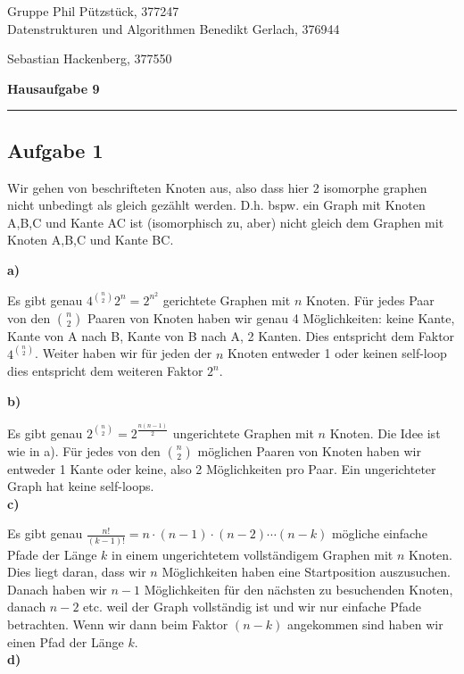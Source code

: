 \documentclass[a4paper,graphics,11pt]{article}
\newcommand{\aufgabe}[1]{\subsection*{Aufgabe #1}}
\begin{document}
\noindent Gruppe              \hfill Phil Pützstück, 377247\\
\noindent Datenstrukturen und Algorithmen \hfill Benedikt Gerlach, 376944\\
\strut\hfill Sebastian Hackenberg, 377550\\
\begin{center}
	\LARGE{\textbf{Hausaufgabe 9}}
\end{center}
\begin{center}
\rule[0.1ex]{\textwidth}{1pt}
\end{center}

\aufgabe{1}
Wir gehen von beschrifteten Knoten aus, also dass hier 2 isomorphe graphen nicht unbedingt als gleich gezählt werden.
D.h. bspw. ein Graph mit Knoten A,B,C und Kante AC ist (isomorphisch zu, aber) nicht gleich dem Graphen mit Knoten A,B,C und Kante BC.

\textbf{a)}

Es gibt genau $4^{\binom{n}{2}}2^n = 2^{n^2}$ gerichtete Graphen mit $n$ Knoten. Für jedes Paar von den $\binom{n}{2}$ Paaren
von Knoten haben wir genau 4 Möglichkeiten: keine Kante, Kante von A nach B, Kante von B nach A, 2 Kanten.
Dies entspricht dem Faktor $4^{\binom{n}{2}}$.
Weiter haben wir für jeden der $n$ Knoten entweder 1 oder keinen self-loop dies entspricht dem weiteren Faktor $2^n$.

\textbf{b)}

Es gibt genau $2^{\binom{n}{2}} = 2^{\frac{n(n-1)}{2}}$ ungerichtete Graphen mit $n$ Knoten. Die Idee ist wie in a). Für jedes von
den $\binom{n}{2}$ möglichen Paaren von Knoten haben wir entweder 1 Kante oder keine, also 2 Möglichkeiten
pro Paar. Ein ungerichteter Graph hat keine self-loops.\\

\textbf{c)}

Es gibt genau $\frac{n!}{(k-1)!} = n \cdot (n-1) \cdot (n-2) \cdots (n-k)$ mögliche einfache Pfade der Länge
$k$ in einem ungerichtetem vollständigem Graphen mit $n$ Knoten. Dies liegt daran, dass wir $n$ Möglichkeiten
haben eine Startposition auszusuchen. Danach haben wir $n-1$ Möglichkeiten für den nächsten zu besuchenden
Knoten, danach $n-2$ etc. weil der Graph vollständig ist und wir nur einfache Pfade betrachten. Wenn wir
dann beim Faktor $(n-k)$ angekommen sind haben wir einen Pfad der Länge $k$.\\

\textbf{d)}
\end{document}
